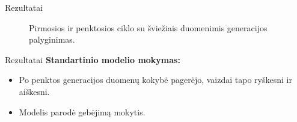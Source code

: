 \documentclass{beamer}
\begin{document}
\begin{frame}{Rezultatai}
    \begin{figure}[!htbp]
        \hfill
        \caption{Pirmosios ir penktosios ciklo su šviežiais duomenimis generacijos palyginimas.}
        \label{fig:comparison_generations}
    \end{figure}
\end{frame}

\begin{frame}{Rezultatai}
   \textbf{Standartinio modelio mokymas:}
        \begin{itemize}
            \item Po penktos generacijos duomenų kokybė pagerėjo, vaizdai tapo ryškesni ir aiškesni.
            \item Modelis parodė gebėjimą mokytis.
        \end{itemize}
\end{frame}
\end{document}
